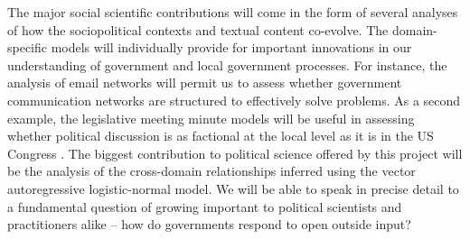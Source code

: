 The major social scientific contributions will come in the form of several analyses of how the sociopolitical contexts and textual content co-evolve. The domain-specific models will individually provide for important innovations in our understanding of government and local government processes. For instance, the analysis of email networks will permit us to assess whether government communication networks are structured to effectively solve problems. As a second example, the legislative meeting minute models will be useful in assessing whether political discussion is as factional at the local level as it is in the US Congress \cite{Harbridge2011}. The biggest contribution to political science offered by this project will be the analysis of the cross-domain relationships inferred using the vector autoregressive logistic-normal model. We will be able to speak in precise detail to a fundamental question of growing important to political scientists and practitioners alike -- how do governments respond to open outside input?









